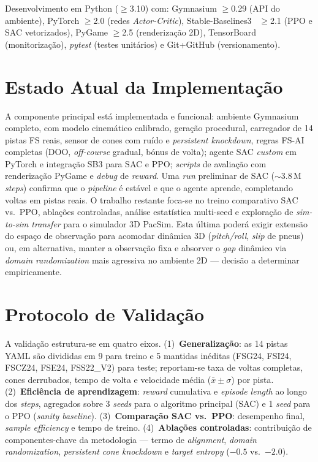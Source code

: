 \documentclass[runningheads]{llncs}
\begin{document}
Desenvolvimento em Python ($\geq$3.10) com: Gymnasium $\geq$0.29 (API do ambiente), PyTorch $\geq$2.0 (redes \textit{Actor-Critic}), Stable-Baselines3~\cite{raffin2021} $\geq$2.1 (PPO e SAC vetorizados), PyGame $\geq$2.5 (renderização 2D), TensorBoard (monitorização), \textit{pytest} (testes unitários) e Git+GitHub (versionamento).

\section{Estado Atual da Implementação}

A componente principal está implementada e funcional: ambiente Gymnasium completo, com modelo cinemático calibrado, geração procedural, carregador de 14 pistas FS reais, sensor de cones com ruído e \textit{persistent knockdown}, regras FS-AI completas (DOO, \textit{off-course} gradual, bónus de volta); agente SAC \textit{custom} em PyTorch e integração SB3 para SAC e PPO; \textit{scripts} de avaliação com renderização PyGame e \textit{debug} de \textit{reward}. Uma \textit{run} preliminar de SAC ($\sim$3.8\,M \textit{steps}) confirma que o \textit{pipeline} é estável e que o agente aprende, completando voltas em pistas reais. O trabalho restante foca-se no treino comparativo SAC vs.\ PPO, ablações controladas, análise estatística multi-seed e exploração de \textit{sim-to-sim transfer} para o simulador 3D PacSim. Esta última poderá exigir extensão do espaço de observação para acomodar dinâmica 3D (\textit{pitch/roll}, \textit{slip} de pneus) ou, em alternativa, manter a observação fixa e absorver o \textit{gap} dinâmico via \textit{domain randomization} mais agressiva no ambiente 2D --- decisão a determinar empiricamente.

\section{Protocolo de Validação}

A validação estrutura-se em quatro eixos. (1)~\textbf{Generalização}: as 14 pistas YAML são divididas em 9 para treino e 5 mantidas inéditas (FSG24, FSI24, FSCZ24, FSE24, FSS22\_V2) para teste; reportam-se taxa de voltas completas, cones derrubados, tempo de volta e velocidade média ($\bar{x}\pm\sigma$) por pista. (2)~\textbf{Eficiência de aprendizagem}: \textit{reward} cumulativa e \textit{episode length} ao longo dos \textit{steps}, agregados sobre 3 \textit{seeds} para o algoritmo principal (SAC) e 1 \textit{seed} para o PPO (\textit{sanity baseline}). (3)~\textbf{Comparação SAC vs.\ PPO}: desempenho final, \textit{sample efficiency} e tempo de treino. (4)~\textbf{Ablações controladas}: contribuição de componentes-chave da metodologia --- termo de \textit{alignment}, \textit{domain randomization}, \textit{persistent cone knockdown} e \textit{target entropy} ($-0.5$ vs.\ $-2.0$).
\end{document}
